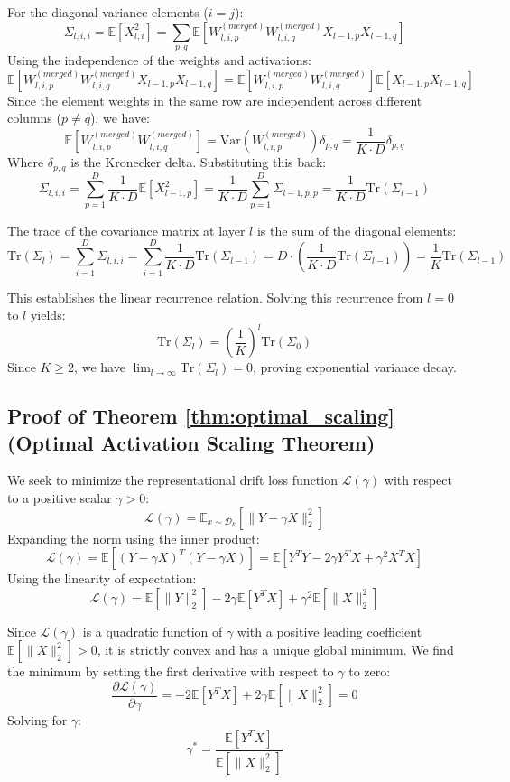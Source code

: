 \documentclass{article}
\theoremstyle{plain}
\theoremstyle{definition}
\theoremstyle{remark}
\begin{document}
For the diagonal variance elements ($i = j$):
$$\Sigma_{l, i, i} = \mathbb{E}[X_{l,i}^2] = \sum_{p, q} \mathbb{E}\left[ W_{l,i,p}^{(merged)} W_{l,i,q}^{(merged)} X_{l-1,p} X_{l-1,q} \right]$$
Using the independence of the weights and activations:
$$\mathbb{E}\left[ W_{l,i,p}^{(merged)} W_{l,i,q}^{(merged)} X_{l-1,p} X_{l-1,q} \right] = \mathbb{E}\left[ W_{l,i,p}^{(merged)} W_{l,i,q}^{(merged)} \right] \mathbb{E}\left[ X_{l-1,p} X_{l-1,q} \right]$$
Since the element weights in the same row are independent across different columns ($p \neq q$), we have:
$$\mathbb{E}\left[ W_{l,i,p}^{(merged)} W_{l,i,q}^{(merged)} \right] = \text{Var}\left( W_{l,i,p}^{(merged)} \right) \delta_{p,q} = \frac{1}{K \cdot D} \delta_{p,q}$$
Where $\delta_{p,q}$ is the Kronecker delta. Substituting this back:
$$\Sigma_{l, i, i} = \sum_{p=1}^D \frac{1}{K \cdot D} \mathbb{E}[X_{l-1, p}^2] = \frac{1}{K \cdot D} \sum_{p=1}^D \Sigma_{l-1, p, p} = \frac{1}{K \cdot D} \text{Tr}(\Sigma_{l-1})$$

The trace of the covariance matrix at layer $l$ is the sum of the diagonal elements:
$$\text{Tr}(\Sigma_l) = \sum_{i=1}^D \Sigma_{l, i, i} = \sum_{i=1}^D \frac{1}{K \cdot D} \text{Tr}(\Sigma_{l-1}) = D \cdot \left( \frac{1}{K \cdot D} \text{Tr}(\Sigma_{l-1}) \right) = \frac{1}{K} \text{Tr}(\Sigma_{l-1})$$

This establishes the linear recurrence relation. Solving this recurrence from $l=0$ to $l$ yields:
$$\text{Tr}(\Sigma_l) = \left(\frac{1}{K}\right)^l \text{Tr}(\Sigma_0)$$
Since $K \ge 2$, we have $\lim_{l \to \infty} \text{Tr}(\Sigma_l) = 0$, proving exponential variance decay.

\subsection{Proof of Theorem \ref{thm:optimal_scaling} (Optimal Activation Scaling Theorem)}
We seek to minimize the representational drift loss function $\mathcal{L}(\gamma)$ with respect to a positive scalar $\gamma > 0$:
$$\mathcal{L}(\gamma) = \mathbb{E}_{x \sim \mathcal{D}_k} \left[ \| Y - \gamma X \|_2^2 \right]$$
Expanding the norm using the inner product:
$$\mathcal{L}(\gamma) = \mathbb{E}\left[ (Y - \gamma X)^T (Y - \gamma X) \right] = \mathbb{E}\left[ Y^T Y - 2\gamma Y^T X + \gamma^2 X^T X \right]$$
Using the linearity of expectation:
$$\mathcal{L}(\gamma) = \mathbb{E}[\|Y\|_2^2] - 2\gamma \mathbb{E}[Y^T X] + \gamma^2 \mathbb{E}[\|X\|_2^2]$$

Since $\mathcal{L}(\gamma)$ is a quadratic function of $\gamma$ with a positive leading coefficient $\mathbb{E}[\|X\|_2^2] > 0$, it is strictly convex and has a unique global minimum. We find the minimum by setting the first derivative with respect to $\gamma$ to zero:
$$\frac{\partial \mathcal{L}(\gamma)}{\partial \gamma} = -2\mathbb{E}[Y^T X] + 2\gamma \mathbb{E}[\|X\|_2^2] = 0$$
Solving for $\gamma$:
$$\gamma^* = \frac{\mathbb{E}[Y^T X]}{\mathbb{E}[\|X\|_2^2]}$$
\end{document}
